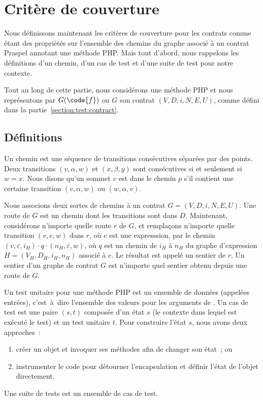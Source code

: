 \section{Critère de couverture}
\label{section:test:criteria}

Nous définissons maintenant les critères de couverture pour les contrats comme
étant des propriétés sur l'ensemble des chemins du graphe associé à un contrat
Praspel annotant une méthode PHP. Mais tout d'abord, nous rappelons les
définitions d'un chemin, d'un cas de test et d'une suite de test pour notre
contexte.

Tout au long de cette partie, nous considérons une méthode PHP  et nous
représentons par $G(\code{f})$ ou $G$ son contrat $(V, D, i, N, E, U)$, comme
défini dans la partie~\ref{section:test:contract}.

\subsection{Définitions}

Un {\strong chemin} est une séquence de transitions consécutives séparées par
des points. Deux transitions $(v, \alpha, w)$ et $(x, \beta, y)$ sont
consécutives si et seulement si $w = x$. Nous disons qu'un sommet $v$ {\strong
est dans} le chemin $p$ s'il contient une certaine transition $(v, \alpha, w)$
ou $(w, \alpha, v)$.

Nous associons deux sortes de chemins à un contrat $G = (V, D, i, N, E, U)$. Une
{\strong route} de $G$ est un chemin dont les transitions sont dans $D$.
Maintenant, considérons n'importe quelle route $r$ de $G$, et remplaçons
n'importe quelle transition $(v, e, w)$ dans $r$, où $e$ est une expresssion,
par le chemin $(v, \varepsilon, i_H) \cdot q \cdot (n_H, \varepsilon, w)$, où
$q$ est un chemin de $i_H$ à $n_H$ du graphe d'expression $H = (V_H, D_H, i_H,
n_H)$ associé à $e$.  Le résultat est appelé un {\strong sentier} de $r$. Un
sentier d'un graphe de contrat $G$ est n'importe quel sentier obtenu depuis une
route de $G$.

Un {\strong test unitaire} pour une méthode PHP  est un ensemble de
données (appelées entrées), c'est~à~dire l'ensemble des valeurs pour les
arguments de . Un {\strong cas de test} est une paire $(s, t)$ composée
d'un état $s$ (le contexte dans lequel est exécuté le test) et un test unitaire
$t$. Pour construire l'état $s$, nous avons deux approches~:
%
\begin{enumerate}

\item créer un objet et invoquer ses méthodes afin de changer son état~; ou

\item instrumenter le code pour détourner l'encapsulation et définir l'état de
l'objet directement.

\end{enumerate}
%
Une {\strong suite de tests} est un ensemble de cas de test.

